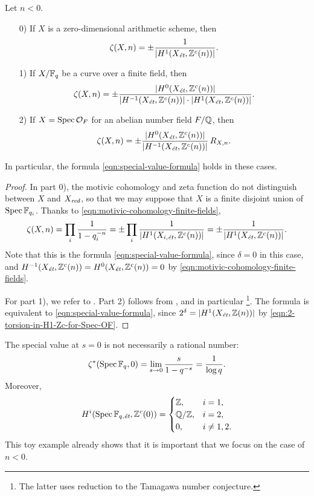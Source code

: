 \documentclass{article}
\numberwithin{equation}{section}
\begin{document}
\begin{lemma}
  \label{lemma:elementary-proof-1}
  Let $n < 0$.

  \begin{enumerate}
  \item[0)] If $X$ is a zero-dimensional arithmetic scheme, then
    $$\zeta (X,n) = \pm \frac{1}{|H^1 (X_\et, \ZZ^c (n))|}.$$

  \item[1)] If $X/\FF_q$ be a curve over a finite field, then
    \[ \zeta (X,n) =
      \pm\frac{|H^0 (X_\et, \ZZ^c(n))|}{|H^{-1} (X_\et, \ZZ^c(n))|\cdot |H^1 (X_\et, \ZZ^c(n))|}. \]

  \item[2)] If $X = \Spec \mathcal{O}_F$ for an abelian number field $F/\QQ$,
    then
    \[ \zeta (X,n) = \pm\frac{|H^0 (X_\et, \ZZ^c(n))|}{|H^{-1} (X_\et, \ZZ^c(n))|}\,R_{X,n}. \]
  \end{enumerate}

  In particular, the formula \eqref{eqn:special-value-formula} holds in these
  cases.

  \begin{proof}
    In part 0), the motivic cohomology and zeta function do not distinguish
    between $X$ and $X_\red$, so that we may suppose that $X$ is a finite
    disjoint union of $\Spec \FF_{q_i}$. Thanks to
    \eqref{eqn:motivic-cohomology-finite-fields},
    \[ \zeta (X,n) = \prod_i \frac{1}{1 - q_i^{-n}} =
      \pm \prod_i \frac{1}{|H^1 (X_{i,\et}, \ZZ^c (n))|} =
      \pm \frac{1}{|H^1 (X_\et, \ZZ^c (n))|}. \]
    Note that this is the formula \eqref{eqn:special-value-formula},
    since $\delta = 0$ in this case, and
    $H^{-1} (X_\et, \ZZ^c (n)) = H^0 (X_\et, \ZZ^c (n)) = 0$ by
    \eqref{eqn:motivic-cohomology-finite-fields}.

    \vspace{1em}

    For part 1), we refer to \cite[\S 5]{Beshenov-Weil-etale-2}.
    Part 2) follows from \cite[\S 5.8.3]{Flach-Morin-2018}, and in particular
    \cite[Proposition~5.35]{Flach-Morin-2018}\footnote{The latter uses reduction
      to the Tamagawa number conjecture.}.
    The formula is equivalent to \eqref{eqn:special-value-formula}, since
    $2^\delta = |H^1 (X_\et, \ZZ (n))|$ by
    \eqref{eqn:2-torsion-in-H1-Zc-for-Spec-OF}.
  \end{proof}
\end{lemma}

\begin{remark}
  The special value at $s = 0$ is not necessarily a rational number:
  \[ \zeta^* (\Spec \FF_q, 0) =
    \lim_{s \to 0} \frac{s}{1 - q^{-s}} =
    \frac{1}{\log q}. \]
  Moreover,
  \[ H^i (\Spec \FF_{q,\et}, \ZZ^c (0)) =
    \begin{cases}
      \ZZ, & i = 1, \\
      \QQ/\ZZ, & i = 2, \\
      0, & i \ne 1,2.
    \end{cases} \]
  This toy example already shows that it is important that we focus on the case
  of $n < 0$.
\end{remark}
\end{document}
